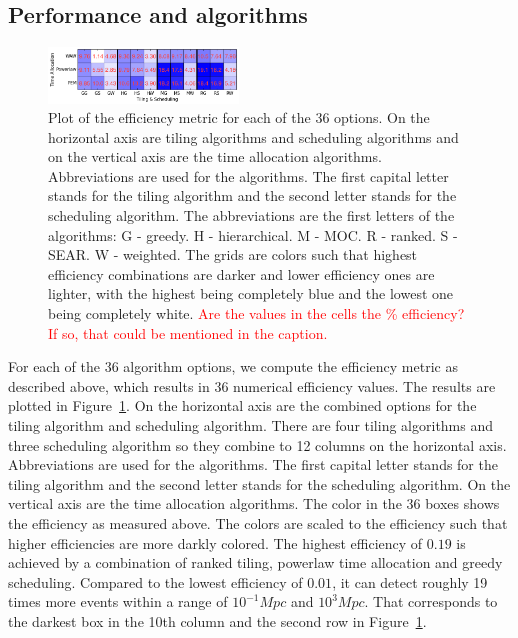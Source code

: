 \documentclass[twocolumn]{aastex62}
\begin{document}
\subsection{Performance and algorithms}
\begin{figure}[t]
\includegraphics[width=0.45\textwidth]{plots/efficiency.png}
	\caption{Plot of the efficiency metric for each of the 36 options. On the horizontal axis are tiling algorithms and scheduling algorithms and on the vertical axis are the time allocation algorithms. Abbreviations are used for the algorithms. The first capital letter stands for the tiling algorithm and the second letter stands for the scheduling algorithm. The abbreviations are the first letters of the algorithms: G - greedy. H - hierarchical. M - MOC. R - ranked. S - SEAR. W - weighted. The grids are colors such that highest efficiency combinations are darker and lower efficiency ones are lighter, with the highest being completely blue and the lowest one being completely white.
	\textcolor{red}{Are the values in the cells the \% efficiency? If so, that could be mentioned
	in the caption.}}
\label{fig:eff_metric}
\centering
\end{figure}
For each of the 36 algorithm options, we compute the efficiency metric as described above, which results in 36 numerical efficiency values. The results are plotted in Figure~\ref{fig:eff_metric}. On the horizontal axis are the combined options for the tiling algorithm and scheduling algorithm. There are four tiling algorithms and three scheduling algorithm so they combine to 12 columns on the horizontal axis. Abbreviations are used for the algorithms. The first capital letter stands for the tiling algorithm and the second letter stands for the scheduling algorithm. On the vertical axis are the time allocation algorithms. The color in the 36 boxes shows the efficiency as measured above. The colors are scaled to the efficiency such that higher efficiencies are more darkly colored.
The highest efficiency of $0.19$ is achieved by a combination of ranked tiling, powerlaw time allocation and greedy scheduling. Compared to the lowest efficiency of $0.01$, it can detect roughly 19 times more events within a range of $10^{-1} Mpc$ and $10^3 Mpc$. That corresponds to the darkest box in the 10th column and the second row in Figure~\ref{fig:eff_metric}. 
\end{document}
